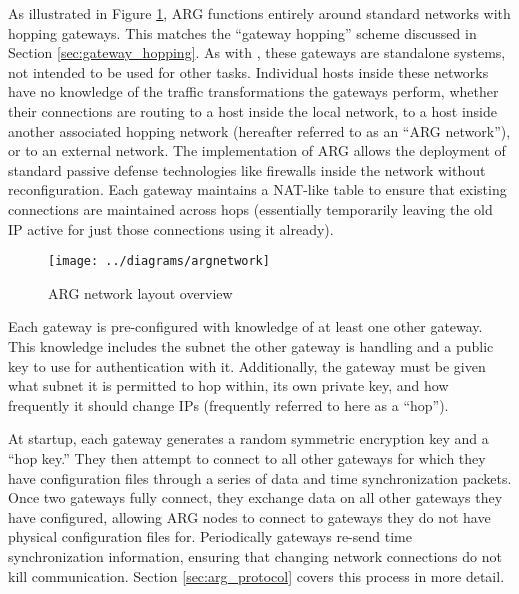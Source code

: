 \par As illustrated in Figure \ref{fig:argnetwork}, \ac{ARG} functions entirely around standard networks with hopping gateways. This matches the ``gateway hopping'' scheme discussed in Section \ref{sec:gateway_hopping}. As with \cite{TAO}, these gateways are standalone systems, not intended to be used for other tasks. Individual hosts inside these networks have no knowledge of the traffic transformations the gateways perform, whether their connections are routing to a host inside the local network, to a host inside another associated hopping network (hereafter referred to as an ``ARG network''), or to an external network. The implementation of ARG allows the deployment of standard passive defense technologies like firewalls inside the network without reconfiguration. Each gateway maintains a \ac{NAT}-like table to ensure that existing connections are maintained across hops (essentially temporarily leaving the old IP active for just those connections using it already).

\begin{figure}
	\centering
	\texttt{[image: ../diagrams/argnetwork]}
	\caption{ARG network layout overview}
	\label{fig:argnetwork}
\end{figure}

\par Each gateway is pre-configured with knowledge of at least one other gateway. This knowledge includes the subnet the other gateway is handling and a public key to use for authentication with it. Additionally, the gateway must be given what subnet it is permitted to hop within, its own private key, and how frequently it should change IPs (frequently referred to here as a ``hop'').

\par At startup, each gateway generates a random symmetric encryption key and a ``hop key.'' They then attempt to connect to all other gateways for which they have configuration files through a series of data and time synchronization packets. Once two gateways fully connect, they exchange data on all other gateways they have configured, allowing ARG nodes to connect to gateways they do not have physical configuration files for. Periodically gateways re-send time synchronization information, ensuring that changing network connections do not kill communication. Section \ref{sec:arg_protocol} covers this process in more detail.

